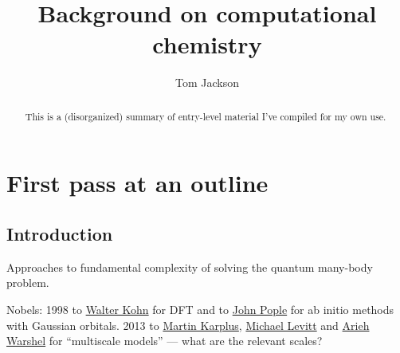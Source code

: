 \documentclass[notitlepage,openany,11pt]{report}
\makeatletter
\theoremstyle{plain}%
\numberwithin{equation}{section}
\newcommand*{\toccontents}{\@starttoc{toc}}
\makeatother
\begin{document}
\newcommand {\be}{\begin{equation*}}
\newcommand {\ee} {\end{equation*}}
\newcommand{\boldref}[1]{\textbf{\ref{#1}}}
\newcommand{\boldnameref}[1]{\textbf{\nameref{#1}}}

\newcommand{\mbf}[1]{\mathbf{#1}}
\newcommand{\mbb}[1]{\mathbb{#1}}
\newcommand{\mcal}[1]{\mathcal{#1}}
\newcommand{\mtilde}[1]{\widetilde{#1}}
\newcommand{\mhat}[1]{\widehat{#1}}
\newcommand{\mol}[1]{\overline{#1}}


\title{Background on computational chemistry}
\author{Tom Jackson}

\hypersetup{pageanchor=false} %

\maketitle

\begin{abstract}
This is a (disorganized) summary of entry-level material I've compiled for my own use.
\end{abstract}

\hypersetup{pageanchor=true}

\toccontents

\restoregeometry


\chapter{First pass at an outline}
\section{Introduction}

Approaches to fundamental complexity of solving the quantum many-body problem.

Nobels: 1998 to \href{https://www.nobelprize.org/prizes/chemistry/1998/kohn/lecture/}{Walter Kohn} for DFT and to \href{https://www.nobelprize.org/prizes/chemistry/1998/pople/lecture/}{John Pople} for ab initio methods with Gaussian orbitals. 2013 to \href{https://www.nobelprize.org/prizes/chemistry/2013/karplus/lecture/}{Martin Karplus}, \href{https://www.nobelprize.org/prizes/chemistry/2013/levitt/lecture/}{Michael Levitt} and \href{https://www.nobelprize.org/prizes/chemistry/2013/warshel/lecture/}{Arieh Warshel} for ``multiscale models'' --- what are the relevant scales?
\end{document}
